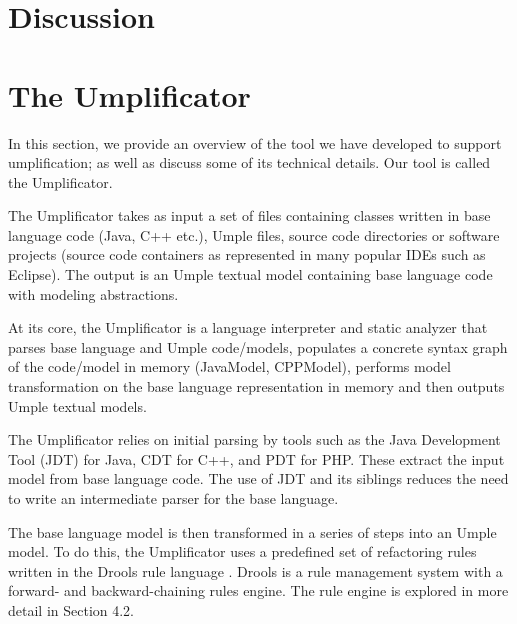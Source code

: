 \section{Discussion}


\section{The Umplificator}
\label{chap:tool}
In this section, we provide an overview of the tool we have developed to support umplification; as well as discuss some of its technical details.
Our tool is called the Umplificator.

The Umplificator takes as input  a set of files containing classes written in base language code (Java, C++ etc.), Umple files, source code directories or software projects (source code containers as represented in many popular IDEs such as Eclipse). The output is an Umple textual model containing base language code with modeling abstractions. 

At its core, the Umplificator is a language interpreter and static analyzer that parses base language and Umple code/models, populates a concrete syntax graph of the code/model in memory (JavaModel, CPPModel), performs model transformation on the base language representation in memory and then outputs Umple textual models.

The Umplificator relies on initial parsing by tools such as the Java Development Tool (JDT) for Java, CDT for C++, and PDT for PHP. These extract the input model from base language code. The use of JDT and its siblings reduces the need to write an intermediate parser for the base language.

The base language model is then transformed in a series of steps into an Umple model. To do this, the Umplificator uses a predefined set of refactoring rules written in the Drools rule language \cite{Drools_Book}. Drools is a rule management system with a forward- and backward-chaining rules engine. The rule engine is explored in more detail in Section 4.2.

